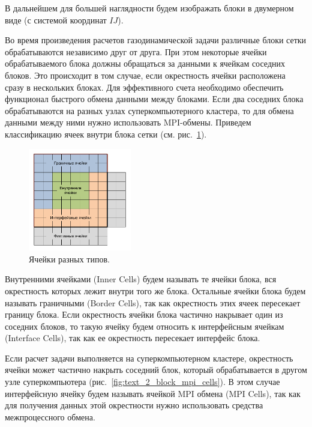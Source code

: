 В дальнейшем для большей наглядности будем изображать блоки в двумерном виде (с системой координат $IJ$).

Во время произведения расчетов газодинамической задачи различные блоки сетки обрабатываются независимо друг от друга.
При этом некоторые ячейки обрабатываемого блока должны обращаться за данными к ячейкам соседних блоков.
Это происходит в том случае, если окрестность ячейки расположена сразу в нескольких блоках.
Для эффективного счета необходимо обеспечить функционал быстрого обмена данными между блоками.
Если два соседних блока обрабатываются на разных узлах суперкомпьютерного кластера, то для обмена данными между ними нужно использовать MPI-обмены.
Приведем классификацию ячеек внутри блока сетки (см. рис.~\ref{fig:text_2_block_block_cells}).

\begin{figure}[ht]
	\centering
	\includegraphics[width=0.4\textwidth]{./pics/text_2_block/4-block-cells.pdf}
	\caption{Ячейки разных типов.}
	\label{fig:text_2_block_block_cells}
\end{figure}

Внутренними ячейками (Inner Cells) будем называть те ячейки блока, вся окрестность которых лежит внутри того же блока. Остальные ячейки блока будем называть граничными (Border Cells), так как окрестность этих ячеек пересекает границу блока. Если окрестность ячейки блока частично накрывает один из соседних блоков, то такую ячейку будем относить к интерфейсным ячейкам (Interface Cells), так как ее окрестность пересекает интерфейс блока.

Если расчет задачи выполняется на суперкомпьютерном кластере, окрестность ячейки может частично накрыть соседний блок, который обрабатывается в другом узле суперкомпьютера (рис.~\ref{fig:text_2_block_mpi_cells}).
В этом случае интерфейсную ячейку будем называть ячейкой MPI обмена (MPI Cells), так как для получения данных этой окрестности нужно использовать средства межпроцессного обмена.


